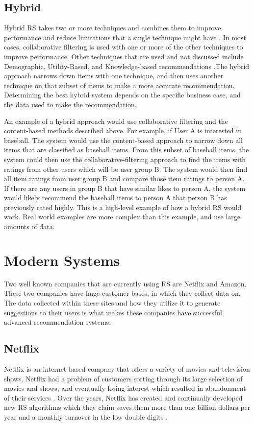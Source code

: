 \documentclass[sigconf]{acmart}
\begin{document}
\subsection{Hybrid}
Hybrid RS takes two or more techniques and combines them to improve performance and reduce limitations that a
single technique might have \cite{Burke2002}. In most cases, collaborative filtering is used with one or more
of the other techniques to improve performance. Other techniques that are used and not discussed include
Demographic, Utility-Based, and Knowledge-based recommendations \cite{Burke2002}.The hybrid approach narrows
down items with one technique, and then uses another technique on that subset of items to make a more accurate
recommendation. Determining the best hybrid system depends on the specific business case, and the data 
used to make the recommendation. 

An example of a hybrid approach would use collaborative filtering and the content-based methods described
above. For example, if User A is interested in baseball. The system would use the content-based approach to
narrow down all items that are classified as baseball items. From this subset of baseball items, the system
could then use the collaborative-filtering approach to find the items with ratings from other users which will
be user group B. The system would then find all item ratings from user group B and compare those item ratings
to person A. If there are any users in group B that have similar likes to person A, the system would likely
recommend the baseball items to person A that person B has previously rated highly. This is a high-level
example of how a hybrid RS would work. Real world examples are more complex than this example, and use large
amounts of data.


\section{Modern Systems}
Two well known companies that are currently using RS are Netflix and Amazon. These two companies have huge
customer bases, in which they collect data on. The data collected within these sites and how they utilize it to
generate suggestions to their users is what makes these companies have successful advanced recommendation
systems. 

\subsection{Netflix}
Netflix is an internet based company that offers a variety of movies and television shows. Netflix had a
problem of customers sorting through its large selection of movies and shows, and eventually losing interest
which resulted in abandonment of their services \cite{Gomez-Uribe2015}. Over the years, Netflix has created and
continually developed new RS algorithms which they claim saves them more than one billion dollars per year and
a monthly turnover in the low double digits \cite{Gomez-Uribe2015}. 
\end{document}
